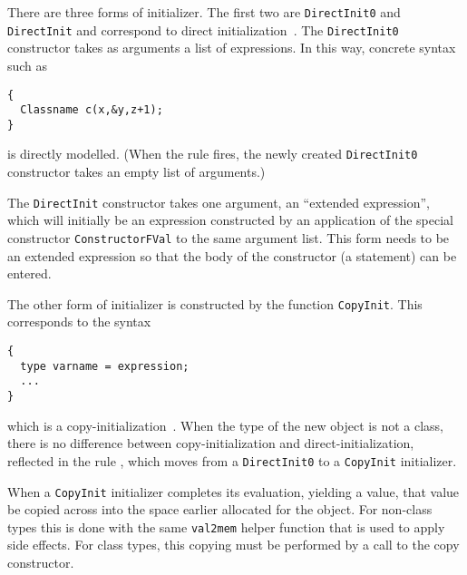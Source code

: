 \documentclass[11pt]{article}
\begin{document}
There are three forms of initializer.  The first two are
\texttt{DirectInit0} and \texttt{DirectInit} and correspond to direct
initialization~\cite[\S 8.5 paragraph 12]{cpp-standard-iso14882}.  The
\texttt{DirectInit0} constructor takes as arguments a list of
expressions.  In this way, concrete syntax such as
\begin{verbatim}
{
  Classname c(x,&y,z+1);
}
\end{verbatim}
is directly modelled.  (When the rule  fires,
the newly created \texttt{DirectInit0} constructor takes an empty list
of arguments.)

The \texttt{DirectInit} constructor takes one argument, an ``extended
expression'', which will initially be an expression constructed by an
application of the special constructor \texttt{ConstructorFVal}%
to the same argument list.  This form needs to be an extended
expression so that the body of the constructor (a statement) can be
entered.

The other form of initializer is constructed by the function
\texttt{CopyInit}.  This corresponds to the syntax
\begin{verbatim}
{
  type varname = expression;
  ...
}
\end{verbatim}
which is a
copy-initialization~\cite[\emph{ibid}]{cpp-standard-iso14882}.  When
the type of the new object is not a class, there is no difference
between copy-initialization and direct-initialization, reflected in
the rule , which
moves from a \texttt{DirectInit0} to a \texttt{CopyInit} initializer.

When a \texttt{CopyInit} initializer completes its evaluation,
yielding a value, that value be copied across into the space earlier
allocated for the object.  For non-class types this is done with the
same \texttt{val2mem} helper function that is used to apply side
effects.  For class types, this copying must be performed by a call to
the copy constructor.
\end{document}
